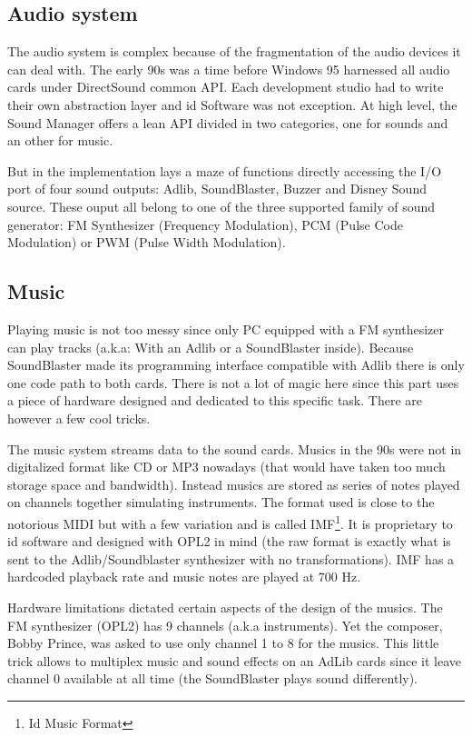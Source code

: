 \subsection{Audio system}
The audio system is complex because of the fragmentation of the audio devices it can deal with. The early 90s was a time before Windows 95 harnessed all audio cards under DirectSound common API. Each development studio had to write their own abstraction layer and id Software was not exception. At high level, the Sound Manager offers a lean API divided in two categories, one for sounds and an other for music.\\
\par
\begin{minipage}{\textwidth}

\end{minipage}
\par
But in the implementation lays a maze of functions directly accessing the I/O port of four sound outputs: Adlib, SoundBlaster, Buzzer and Disney Sound source. These ouput all belong to one of the three supported family of sound generator: FM Synthesizer (Frequency Modulation), PCM (Pulse Code Modulation) or PWM (Pulse Width Modulation).\\


\subsection{Music}
Playing music is not too messy since only PC equipped with a FM synthesizer can play tracks (a.k.a: With an Adlib or a SoundBlaster inside). Because SoundBlaster made its programming interface compatible with Adlib there is only one code path to both cards. There is not a lot of magic here since this part uses a piece of hardware designed and dedicated to this specific task. There are however a few cool tricks.\\
\par
The music system streams data to the sound cards.  Musics in the 90s were not in digitalized format like CD or MP3 nowadays (that would have taken too much storage space and bandwidth). Instead musics are stored as series of notes played on channels together simulating instruments. The format used is close to the notorious MIDI but with a few variation and is called IMF\footnote{Id Music Format}. It is proprietary to id software and designed with OPL2 in mind (the raw format is exactly what is sent to the Adlib/Soundblaster synthesizer with no transformations). IMF has a hardcoded playback rate and music notes are played at 700 Hz.\\
\par
Hardware limitations dictated certain aspects of the design of the musics. The FM synthesizer (OPL2) has 9 channels (a.k.a instruments). Yet the composer, Bobby Prince, was asked to use only channel 1 to 8 for the musics. This little trick allows to multiplex music and sound effects on an AdLib cards since it leave channel 0 available at all time (the SoundBlaster plays sound differently).\\




